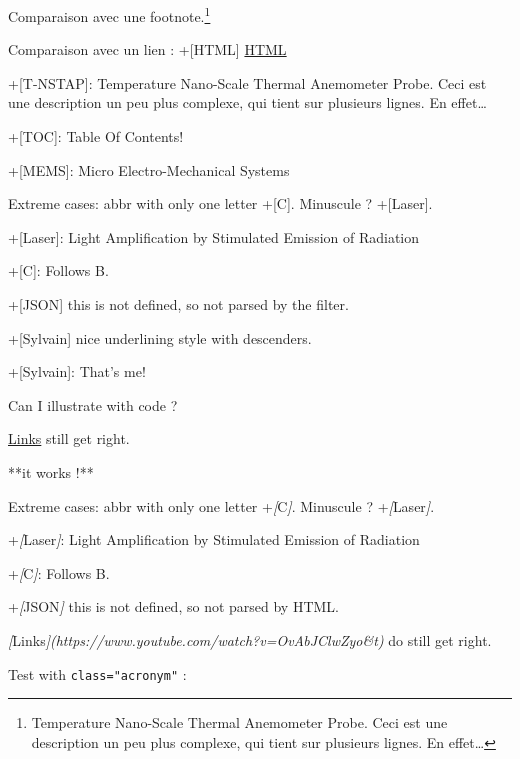 \documentclass[
]{article}
\newenvironment{Shaded}{}{}
\newcommand{\CommentTok}[1]{\textcolor[rgb]{0.38,0.63,0.69}{\textit{#1}}}
\newcommand{\NormalTok}[1]{#1}
\newcommand{\OtherTok}[1]{\textcolor[rgb]{0.00,0.44,0.13}{#1}}
\begin{document}
Comparaison avec une footnote.\footnote{Temperature Nano-Scale Thermal
  Anemometer Probe. Ceci est une description un peu plus complexe, qui
  tient sur plusieurs lignes. En effet\ldots{}}

Comparaison avec un lien : +{[}HTML{]} \hyperref[]{HTML}

+{[}T-NSTAP{]}: Temperature Nano-Scale Thermal Anemometer Probe. Ceci
est une description un peu plus complexe, qui tient sur plusieurs
lignes. En effet\ldots{}

+{[}TOC{]}: Table Of Contents!

+{[}MEMS{]}: Micro Electro-Mechanical Systems

Extreme cases: abbr with only one letter +{[}C{]}. Minuscule ?
+{[}Laser{]}.

+{[}Laser{]}: Light Amplification by Stimulated Emission of Radiation

+{[}C{]}: Follows B.

+{[}JSON{]} this is not defined, so not parsed by the filter.

+{[}Sylvain{]} nice underlining style with descenders.

+{[}Sylvain{]}: That's me!

Can I illustrate with code ?

\href{https://www.youtube.com/watch?v=OvAbJClwZyo&t}{Links} still get
right.

\begin{Shaded}
\begin{Highlighting}[]
\NormalTok{**it works !**}

\NormalTok{Extreme cases: abbr with only one letter +}\CommentTok{[}\OtherTok{C}\CommentTok{]}\NormalTok{. Minuscule ? +}\CommentTok{[}\OtherTok{Laser}\CommentTok{]}\NormalTok{.}

\NormalTok{+}\CommentTok{[}\OtherTok{Laser}\CommentTok{]}\NormalTok{: Light Amplification by Stimulated Emission of Radiation}

\NormalTok{+}\CommentTok{[}\OtherTok{C}\CommentTok{]}\NormalTok{: Follows B.}

\NormalTok{+}\CommentTok{[}\OtherTok{JSON}\CommentTok{]}\NormalTok{ this is not defined, so not parsed by HTML.}

\CommentTok{[}\OtherTok{Links}\CommentTok{](https://www.youtube.com/watch?v=OvAbJClwZyo\&t)}\NormalTok{ do still get right.}
\end{Highlighting}
\end{Shaded}

Test with \texttt{class="acronym"} :
\end{document}
